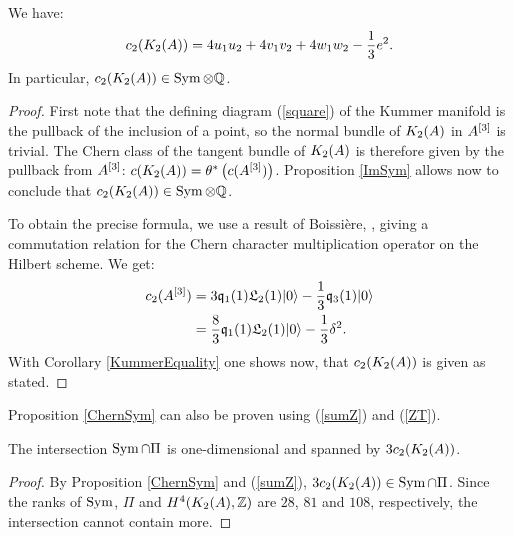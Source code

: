 \begin{proposition} \label{ChernSym}
We have:
\begin{equation}
c_2(K_{ 2 }( A ))= 4 u_1u_2 + 4v_1v_2 + 4 w_1 w_2 - \frac{1}{3} e^2. 
\end{equation}
In particular, $c_2(K_{ 2 }( A ))\in \operatorname{Sym} \otimes\mathbb{Q} $.
\end{proposition}
\begin{proof}
First note that the defining diagram (\ref{square}) of the Kummer manifold is the pullback of the inclusion of a point, so the normal bundle of $K_{ 2 }( A )$ in $A^{[3]}$ is trivial. The Chern class of the tangent bundle of $K_{ 2 }( A )$ is therefore given by the pullback from $A^{[3]}$: $c(K_{ 2 }( A )) = \theta^*\left(c(A^{[3]})\right)$. Proposition \ref{ImSym} allows now to conclude that $c_2(K_{ 2 }( A ))\in \operatorname{Sym} \otimes \mathbb{Q}$.

To obtain the precise formula, we use a result of Boissi\`ere, \cite[Lemma 3.12]{Boissiere}, giving a commutation relation for the Chern character multiplication operator on the Hilbert scheme. We get:
\begin{align*}
c_2(A^{[3]}) & = 3\mathfrak{q}_1(1)\mathfrak L_2(1)|0\rangle - \frac{1}{3} \mathfrak{q}_3(1)|0\rangle \\
 & =\frac{8}{3}\mathfrak{q}_1(1)\mathfrak L_2(1)|0\rangle - \frac{1}{3} \delta^2 .
\end{align*}
With Corollary \ref{KummerEquality} one shows now, that $c_2(K_{ 2 }( A ))$ is given as stated.
\end{proof}
\begin{rmk}
Proposition \ref{ChernSym} can also be proven using (\ref{sumZ}) and (\ref{ZT}).
\end{rmk}


\begin{corollary}\label{Pi'}
The intersection $\operatorname{Sym}\cap \Pi$ is one-dimensional and spanned by $3c_2(K_{ 2 }( A ))$. 
\end{corollary}
\begin{proof}
By Proposition \ref{ChernSym} and (\ref{sumZ}), $3c_2(K_{ 2 }( A ))\in \operatorname{Sym}\cap \Pi$. Since the ranks of $\operatorname{Sym}$, $\Pi$ and $H^4(K_{ 2 }( A ),\mathbb{Z})$ are $28$, $81$ and $108$, respectively, the intersection cannot contain more.
\end{proof}

